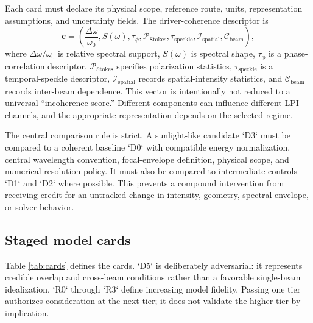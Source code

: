 \documentclass[conference]{../../../../Conference-LaTeX-template_10-17-19/IEEEtran}
\begin{document}
Each card must declare its physical scope, reference route, units, representation assumptions, and uncertainty fields. The driver-coherence descriptor is
\begin{equation}
\mathbf{c}=\left(\frac{\Delta\omega}{\omega_0},S(\omega),\tau_{\phi},\mathcal{P}_{\mathrm{Stokes}},\tau_{\mathrm{speckle}},\mathcal{I}_{\mathrm{spatial}},\mathcal{C}_{\mathrm{beam}}\right),
\label{eq:descriptor}
\end{equation}
where $\Delta\omega/\omega_0$ is relative spectral support, $S(\omega)$ is spectral shape, $\tau_{\phi}$ is a phase-correlation descriptor, $\mathcal{P}_{\mathrm{Stokes}}$ specifies polarization statistics, $\tau_{\mathrm{speckle}}$ is a temporal-speckle descriptor, $\mathcal{I}_{\mathrm{spatial}}$ records spatial-intensity statistics, and $\mathcal{C}_{\mathrm{beam}}$ records inter-beam dependence. This vector is intentionally not reduced to a universal ``incoherence score.'' Different components can influence different LPI channels, and the appropriate representation depends on the selected regime.

The central comparison rule is strict. A sunlight-like candidate `D3` must be compared to a coherent baseline `D0` with compatible energy normalization, central wavelength convention, focal-envelope definition, physical scope, and numerical-resolution policy. It must also be compared to intermediate controls `D1` and `D2` where possible. This prevents a compound intervention from receiving credit for an untracked change in intensity, geometry, spectral envelope, or solver behavior.

\subsection{Staged model cards}
Table \ref{tab:cards} defines the cards. `D5` is deliberately adversarial: it represents credible overlap and cross-beam conditions rather than a favorable single-beam idealization. `R0` through `R3` define increasing model fidelity. Passing one tier authorizes consideration at the next tier; it does not validate the higher tier by implication.
\end{document}
